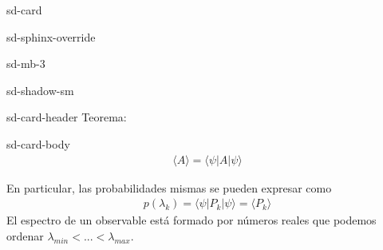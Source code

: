\documentclass[letterpaper,10pt,english]{jupyterBook}
\newcommand{\bra}[1]{\langle #1|}
\newcommand{\ket}[1]{|#1\rangle}
\begin{document}
\begin{sphinxuseclass}{sd-card}
\begin{sphinxuseclass}{sd-sphinx-override}
\begin{sphinxuseclass}{sd-mb-3}
\begin{sphinxuseclass}{sd-shadow-sm}
\begin{sphinxuseclass}{sd-card-header}
\sphinxAtStartPar
Teorema:

\end{sphinxuseclass}
\begin{sphinxuseclass}{sd-card-body}\begin{equation*}
\begin{split}\langle A \rangle=\bra{\psi}A \ket{\psi} \end{split}
\end{equation*}
\end{sphinxuseclass}
\end{sphinxuseclass}
\end{sphinxuseclass}
\end{sphinxuseclass}
\end{sphinxuseclass}
\sphinxAtStartPar
En particular, las probabilidades mismas se pueden expresar como 
\begin{equation*}
\begin{split}
p(\lambda_k ) =  \bra{\psi}P_k\ket{\psi} = \langle P_k\rangle 
\end{split}
\end{equation*}
\sphinxAtStartPar
El espectro de un observable está formado por números reales que podemos ordenar \(\lambda_{min}<...<\lambda_{max}\).
\end{document}
